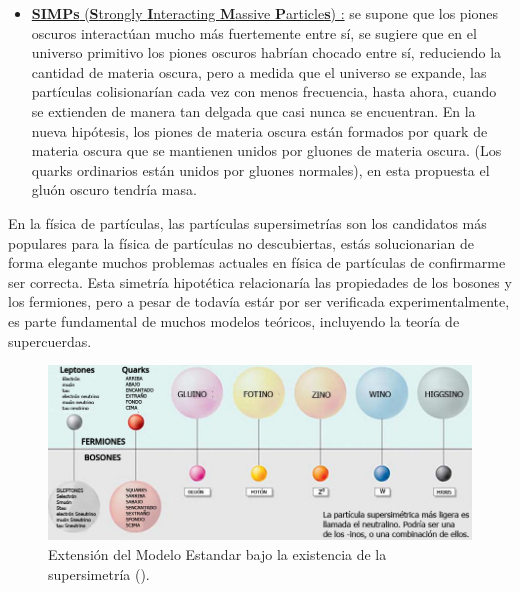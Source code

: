 \begin{itemize}
\item \href{https://es.scribd.com/document/273103231/Dark-Pion-Particles-May-Explain-Universe-s-Invisible-Matter}{\textbf{SIMPs} (\textbf{S}trongly \textbf{I}nteracting \textbf{M}assive \textbf{P}article\textbf{s}) :} se supone que los piones oscuros interactúan mucho más fuertemente entre sí, se sugiere que en el universo primitivo los piones oscuros habrían chocado entre sí, reduciendo la cantidad de materia oscura, pero a medida que el universo se expande, las partículas colisionarían cada vez con menos frecuencia, hasta ahora, cuando se extienden de manera tan delgada que casi nunca se encuentran. En la nueva hipótesis, los piones de materia oscura están formados por quark de materia oscura que se mantienen unidos por gluones de materia oscura. (Los quarks ordinarios están unidos por gluones normales), en esta propuesta el gluón oscuro tendría masa.
\end{itemize}

En la física de partículas, las partículas supersimetrías son los candidatos más populares para la física de partículas no descubiertas, estás solucionarian de forma elegante muchos problemas actuales en física de partículas de confirmarme ser correcta. Esta simetría hipotética relacionaría las propiedades de los bosones y los fermiones, pero a pesar de todavía estár por ser verificada experimentalmente, es parte fundamental de muchos modelos teóricos, incluyendo la teoría de supercuerdas. 
\begin{figure}[h!]
\centering
\includegraphics[width=.9\textwidth]{Analisis_y_Resultados/imagenes/supersimetrias.png}
\caption{Extensión del Modelo Estandar bajo la existencia de la supersimetría (\SUSY). %
}
\label{susy}
\end{figure}

